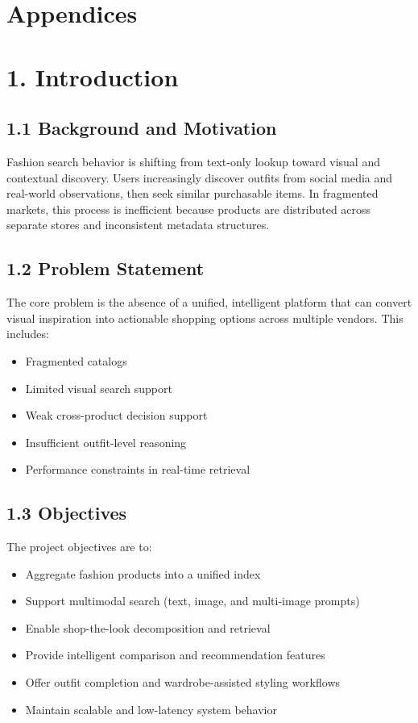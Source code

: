 \documentclass[12pt,a4paper]{report}
\begin{document}
\chapter*{Appendices}


\chapter{1. Introduction}
\section{1.1 Background and Motivation}
Fashion search behavior is shifting from text-only lookup toward visual and contextual discovery. Users increasingly discover outfits from social media and real-world observations, then seek similar purchasable items. In fragmented markets, this process is inefficient because products are distributed across separate stores and inconsistent metadata structures.


\section{1.2 Problem Statement}
The core problem is the absence of a unified, intelligent platform that can convert visual inspiration into actionable shopping options across multiple vendors. This includes:

\begin{itemize}
\item Fragmented catalogs
\item Limited visual search support
\item Weak cross-product decision support
\item Insufficient outfit-level reasoning
\item Performance constraints in real-time retrieval
\end{itemize}

\section{1.3 Objectives}
The project objectives are to:

\begin{itemize}
\item Aggregate fashion products into a unified index
\item Support multimodal search (text, image, and multi-image prompts)
\item Enable shop-the-look decomposition and retrieval
\item Provide intelligent comparison and recommendation features
\item Offer outfit completion and wardrobe-assisted styling workflows
\item Maintain scalable and low-latency system behavior
\end{itemize}
\end{document}
